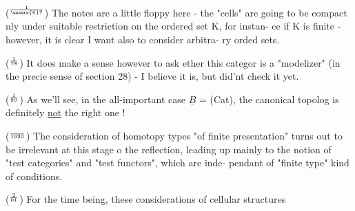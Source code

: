 ($^{1\over{\unsure{6}}{7}}$) The notes are a little floppy here - the "cells" are going to be
compact nly under suitable restriction on the ordered set K, for instan-%
ce if K is finite - however, it is clear I want also to consider arbitra-%
ry orded sets.

($^{1\over{7}{8}}$) It does make a sense however to ask ether this categor is a
"modelizer" (in the precie sense of section 28) - I believe it is, but
did'nt check it yet.

($^{1\over{8}{9}}$) As we'll see, in the all-important case $\underline{B}$ = (Cat), the canonical
topolog is definitely \uline{not} the right one !

($^{\over{19}{20}}$) The consideration of homotopy types "of finite presentation" turns
out to be irrelevant at this stage o the reflection, leading up mainly
to the notion of "test categories" and "test functors", which are inde-%
pendant of "finite type" kind of conditions.

($^{2\over{0}{1}}$) For the time being, these considerations of cellular structures

